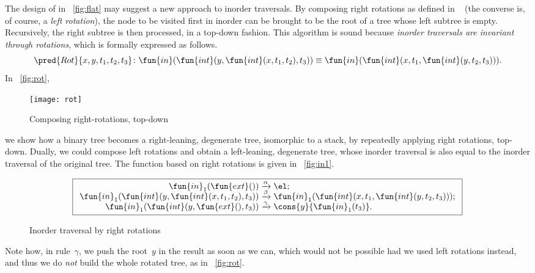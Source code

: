 The design of
 in
\fig~\vref{fig:flat} may suggest a new approach to inorder
traversals. By composing right rotations
as defined in \figs~ (the converse is,
of course, a \emph{left rotation}), the node to be visited first in
inorder can be brought to be the root of a tree whose left subtree is
empty. Recursively, the right subtree is then processed, in a
top\hyp{}down fashion. This algorithm is sound because \emph{inorder
  traversals are invariant through rotations}, which is formally
expressed as follows.
\begin{equation*}
\pred{Rot}{x,y,t_1,t_2,t_3} \colon
\fun{in}(\fun{int}(y,\fun{int}(x,t_1,t_2),t_3))
\equiv
\fun{in}(\fun{int}(x,t_1,\fun{int}(y,t_2,t_3))).\index{in@\fun{in/1}}
\label{def:Rot}
\end{equation*}
In \fig~\vref{fig:rot},
\begin{figure}[t]
\centering
\texttt{[image: rot]}
\caption{Composing right\hyp{}rotations, top\hyp{}down}
\label{fig:rot}
\end{figure}
we show how a binary tree becomes a right\hyp{}leaning,
degenerate tree, isomorphic to a
stack, by repeatedly applying right rotations, top\hyp{}down.  Dually,
we could compose left rotations and obtain a left\hyp{}leaning,
degenerate tree, whose inorder traversal is also equal to the inorder
traversal of the original tree. The function
 based on right rotations
is given in \fig~\vref{fig:in1}.
\begin{figure}
\begin{equation*}
\boxed{
\begin{array}{r@{\;}c@{\;}l}
\fun{in}_1(\fun{ext}()) & \xrightarrow{\smash{\alpha}} & \el;\\
\fun{in}_1(\fun{int}(y,\fun{int}(x,t_1,t_2),t_3))
  & \xrightarrow{\smash{\beta}} & \fun{in}_1(\fun{int}(x,t_1,\fun{int}(y,t_2,t_3)));\\
\fun{in}_1(\fun{int}(y,\fun{ext}(),t_3))
  & \xrightarrow{\smash{\gamma}} & \cons{y}{\fun{in}_1(t_3)}.
\end{array}}
\end{equation*}
\caption{Inorder traversal by right rotations}
\label{fig:in1}
\end{figure}
Note how, in rule~\(\gamma\), we push the root~\(y\) in the result as
soon as we can, which would not be possible had we used left rotations
instead, and thus we do \emph{not} build the whole rotated tree, as in
\fig~\vref{fig:rot}.

